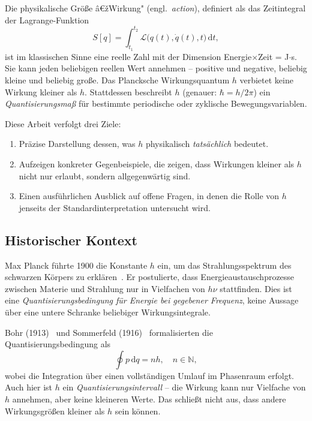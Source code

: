 ﻿\documentclass[12pt,a4paper]{article}
\theoremstyle{plain}
\theoremstyle{definition}
\theoremstyle{remark}
\newcommand{\Lagr}{\mathcal{L}}
\begin{document}
Die physikalische Größe â€žWirkung" (engl.\ \emph{action}), definiert als das Zeitintegral der
Lagrange-Funktion
\begin{equation}
  S[q] = \int_{t_1}^{t_2} \Lagr\!\bigl(q(t),\dot{q}(t),t\bigr)\,\mathrm{d}t,
  \label{eq:action_def}
\end{equation}
ist im klassischen Sinne eine reelle Zahl mit der Dimension Energie$\times$Zeit = J$\cdot$s. Sie kann
jeden beliebigen reellen Wert annehmen -- positive und negative, beliebig kleine und beliebig große.
Das Plancksche Wirkungsquantum $h$ verbietet keine Wirkung kleiner als $h$. Stattdessen beschreibt
$h$ (genauer: $\hbar = h/2\pi$) ein \emph{Quantisierungsmaß} für bestimmte periodische
oder zyklische Bewegungsvariablen.

Diese Arbeit verfolgt drei Ziele:
\begin{enumerate}[label=(\roman*)]
  \item Präzise Darstellung dessen, was $h$ physikalisch \emph{tatsächlich} bedeutet.
  \item Aufzeigen konkreter Gegenbeispiele, die zeigen, dass Wirkungen kleiner als $h$
        nicht nur erlaubt, sondern allgegenwärtig sind.
  \item Einen ausführlichen Ausblick auf offene Fragen, in denen die Rolle von $h$ jenseits
        der Standardinterpretation untersucht wird.
\end{enumerate}

\subsection{Historischer Kontext}

Max Planck führte 1900 die Konstante $h$ ein, um das Strahlungsspektrum des schwarzen
Körpers zu erklären~\cite{planck1900}. Er postulierte, dass Energieaustauschprozesse zwischen
Materie und Strahlung nur in Vielfachen von $h\nu$ stattfinden. Dies ist eine
\emph{Quantisierungsbedingung für Energie bei gegebener Frequenz}, keine Aussage über
eine untere Schranke beliebiger Wirkungsintegrale.

Bohr (1913)~\cite{bohr1913} und Sommerfeld (1916)~\cite{sommerfeld1916} formalisierten
die Quantisierungsbedingung als
\begin{equation}
  \oint p\,\mathrm{d}q = n h, \quad n \in \mathbb{N},
  \label{eq:bohr_sommerfeld}
\end{equation}
wobei die Integration über einen vollständigen Umlauf im Phasenraum erfolgt. Auch hier
ist $h$ ein \emph{Quantisierungsintervall} -- die Wirkung kann nur Vielfache von $h$
annehmen, aber keine kleineren Werte. Das schließt nicht aus, dass andere Wirkungsgrößen
kleiner als $h$ sein können.
\end{document}
